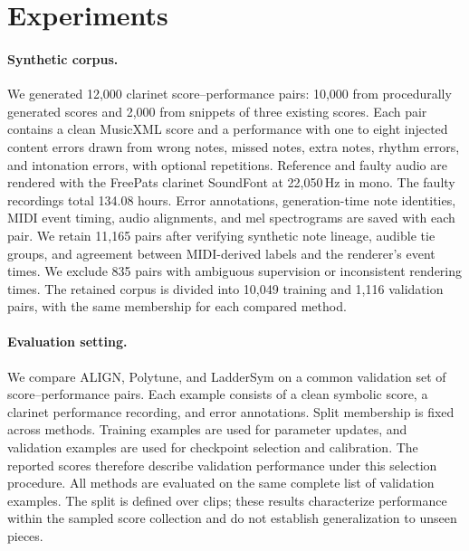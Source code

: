 \section{Experiments}
\label{sec:experiments}

\paragraph{Synthetic corpus.}
We generated 12,000 clarinet score--performance pairs: 10,000 from
procedurally generated scores and 2,000 from snippets of three existing
scores. Each pair contains a clean MusicXML score and a performance with
one to eight injected content errors drawn from wrong notes, missed notes,
extra notes, rhythm errors, and intonation errors, with optional repetitions.
Reference and faulty audio are rendered with the FreePats clarinet SoundFont
at 22,050\,Hz in mono. The faulty recordings total 134.08 hours. Error
annotations, generation-time note identities, MIDI event timing, audio
alignments, and mel spectrograms are saved with each pair.
We retain 11,165 pairs after verifying synthetic note lineage, audible tie
groups, and agreement between MIDI-derived labels and the renderer's event
times. We exclude 835 pairs with ambiguous supervision or inconsistent
rendering times. The retained corpus is divided into 10,049 training and
1,116 validation pairs, with the same membership for each compared method.

\paragraph{Evaluation setting.}
We compare ALIGN, Polytune, and LadderSym on a common validation set of
score--performance pairs. Each example consists of a clean symbolic score,
a clarinet performance recording, and error annotations. Split membership
is fixed across methods. Training examples are used for parameter updates,
and validation examples are used for checkpoint selection and calibration.
The reported scores therefore describe validation performance under this
selection procedure. All methods are evaluated on the same complete list
of validation examples.
The split is defined over clips; these results characterize performance
within the sampled score collection and do not establish generalization
to unseen pieces.

